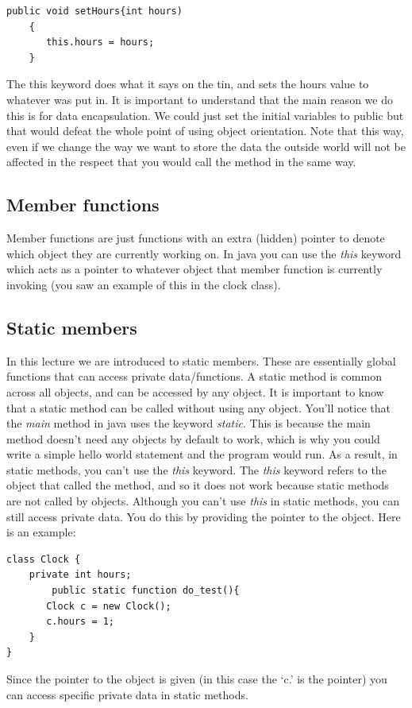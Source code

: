 \documentclass{article}
\begin{document}
\begin{lstlisting}
public void setHours{int hours)
	{
	   this.hours = hours;
	}
\end{lstlisting}

The this keyword does what it says on the tin, and sets the hours value to whatever was put in. It is important
to understand that the main reason we do this is for data encapsulation. We could just set the initial variables 
to public but that would defeat the whole point of using object orientation. Note that this way, even if we change 
the way we want to store the data the outside world will not be affected in the respect that you would call the 
method in the same way.

\subsection{Member functions}

Member functions are just functions with an extra (hidden) pointer to denote which object they are currently working on.
In java you can use the \emph{this} keyword which acts as a pointer to whatever object that member function is currently
invoking (you saw an example of this in the clock class).

\subsection{Static members}
In this lecture we are introduced to static members. These are essentially global functions that can access private
data/functions. A static method is common across all objects, and can be accessed by any object. It is important to 
know that a static method can be called without using any object. You'll notice that the \emph{main} method in java
uses the keyword \emph{static}. This is because the main method doesn't need any objects by default to work, which 
is why you could write a simple hello world statement and the program would run. As a result, in static methods, you
can't use the \emph{this} keyword. The \emph{this} keyword refers to the object that called the method, and so it does
not work because static methods are not called by objects. Although you can't use \emph{this} in static methods, you 
can still access private data. You do this by providing the pointer to the object. Here is an example:

\begin{lstlisting}
class Clock {
    private int hours;
      	public static function do_test(){
	   Clock c = new Clock();
	   c.hours = 1;
	}
}
\end{lstlisting}
Since the pointer to the object is given (in this case the `c.' is the pointer) you can access specific private
data in static methods. 
\end{document}
